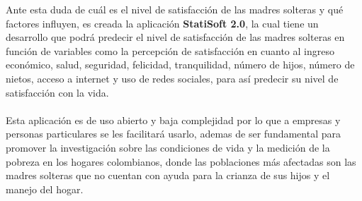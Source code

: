 \documentclass[11pt,twoside]{article}
\begin{document}
\noindent
Ante esta duda de cuál es el nivel de satisfacción de las madres solteras y qué factores influyen, es creada la aplicación \textbf{StatiSoft 2.0}, la cual tiene un desarrollo que podrá predecir el nivel de satisfacción de las madres solteras en función de variables como la percepción de satisfacción en cuanto al ingreso económico, salud, seguridad, felicidad, tranquilidad, número de hijos, número de nietos, acceso a internet y uso de redes sociales, para así predecir su nivel de satisfacción con la vida. 
\\
\\
Esta aplicación es de  uso abierto y  baja complejidad por lo que a empresas y personas particulares  se les facilitará usarlo, ademas de ser fundamental para promover la investigación sobre las condiciones de vida y la medición de la pobreza en los hogares colombianos, donde las poblaciones más afectadas son las madres solteras que no cuentan con ayuda para la crianza de sus hijos y el manejo del hogar.




\end{document}
